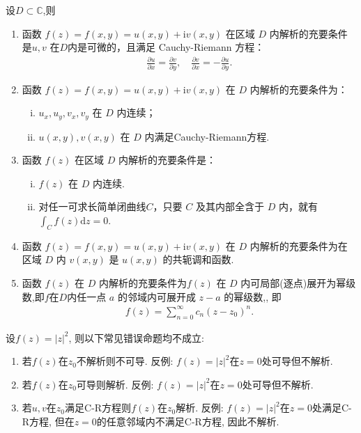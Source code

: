 \documentclass[../../main.tex]{subfiles}%
\begin{document}
\begin{theorem}[函数在区域内解析的充要条件]\label{theorem:函数在区域内解析的充要条件}
设$D\subset \mathbb{C}$,则
\begin{enumerate}[(1)]
\item 函数 \(f(z) = f(x,y) = u(x,y) + \mathrm{i}v(x,y)\) 在区域 \(D\) 内解析的充要条件是\(u, v\) 在$D$内是可微的，且满足 Cauchy-Riemann 方程：
\begin{align*}
\frac{\partial u}{\partial x} = \frac{\partial v}{\partial y}, \quad \frac{\partial v}{\partial x} = -\frac{\partial u}{\partial y}.
\end{align*}

\item 函数 \(f(z) = f(x,y) = u(x,y) + \mathrm{i}v(x,y)\) 在 \(D\) 内解析的充要条件为：
\begin{enumerate}[(i)]
\item \(u_x, u_y, v_x, v_y\) 在 \(D\) 内连续；
\item \(u(x,y), v(x,y)\) 在 \(D\) 内满足Cauchy-Riemann方程.
\end{enumerate}

\item 函数 \(f(z)\) 在区域 \(D\) 内解析的充要条件是：
\begin{enumerate}[(i)]
\item \(f(z)\) 在 \(D\) 内连续.
\item 对任一可求长简单闭曲线\(C\)，只要 \(C\) 及其内部全含于 \(D\) 内，就有 \(\int_{C} f(z) \mathrm{d}z = 0\).
\end{enumerate}

\item 函数 \(f(z) = f(x,y) = u(x,y) + \mathrm{i}v(x,y)\) 在 \(D\) 内解析的充要条件为在区域 \(D\) 内 \(v(x,y)\) 是 \(u(x,y)\) 的共轭调和函数.

\item 函数 \(f(z)\) 在 \(D\) 内解析的充要条件为\(f(z)\) 在 \(D\) 内可局部(逐点)展开为幂级数,即$f$在$D$内任一点 \(a\) 的邻域内可展开成 \(z - a\) 的幂级数,, 即
\begin{align*}
f(z) = \sum\limits_{n=0}^{\infty} c_n (z-z_0)^n.
\end{align*}
\end{enumerate}
\end{theorem}

\begin{example}
设$f(z)=|z|^2$, 则以下常见错误命题均不成立:
\begin{enumerate}[(1)]
\item 若$f(z)$在$z_0$不解析则不可导. 反例: $f(z)=|z|^2$在$z=0$处可导但不解析.
\item 若$f(z)$在$z_0$可导则解析. 反例: $f(z)=|z|^2$在$z=0$处可导但不解析.
\item 若$u,v$在$z_0$满足C-R方程则$f(z)$在$z_0$解析. 反例: $f(z)=|z|^2$在$z=0$处满足C-R方程, 但在$z=0$的任意邻域内不满足C-R方程, 因此不解析.
\end{enumerate}
\end{example}
\end{document}

